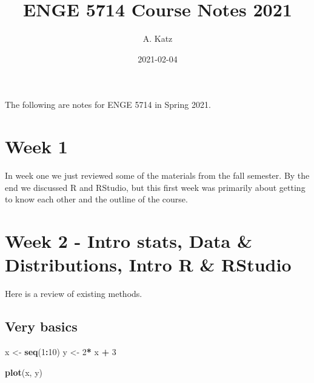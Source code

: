 \documentclass[
]{book}
\title{ENGE 5714 Course Notes 2021}
\author{A. Katz}
\date{2021-02-04}
\newenvironment{Shaded}{\begin{snugshade}}{\end{snugshade}}
\newcommand{\DecValTok}[1]{\textcolor[rgb]{0.00,0.00,0.81}{#1}}
\newcommand{\KeywordTok}[1]{\textcolor[rgb]{0.13,0.29,0.53}{\textbf{#1}}}
\newcommand{\NormalTok}[1]{#1}
\newcommand{\OperatorTok}[1]{\textcolor[rgb]{0.81,0.36,0.00}{\textbf{#1}}}
\newcommand{\StringTok}[1]{\textcolor[rgb]{0.31,0.60,0.02}{#1}}
\begin{document}
\maketitle

{
\setcounter{tocdepth}{1}
\tableofcontents
}
The following are notes for ENGE 5714 in Spring 2021.

\hypertarget{intro}{%
\chapter{Week 1}\label{intro}}

In week one we just reviewed some of the materials from the fall semester. By the end we discussed R and RStudio, but this first week was primarily about getting to know each other and the outline of the course.

\hypertarget{week-2---intro-stats-data-distributions-intro-r-rstudio}{%
\chapter{Week 2 - Intro stats, Data \& Distributions, Intro R \& RStudio}\label{week-2---intro-stats-data-distributions-intro-r-rstudio}}

Here is a review of existing methods.

\hypertarget{very-basics}{%
\section{Very basics}\label{very-basics}}

\begin{Shaded}
\begin{Highlighting}[]
\NormalTok{x \textless{}{-}}\StringTok{ }\KeywordTok{seq}\NormalTok{(}\DecValTok{1}\OperatorTok{:}\DecValTok{10}\NormalTok{)}
\NormalTok{y \textless{}{-}}\StringTok{ }\DecValTok{2}\OperatorTok{*}\StringTok{ }\NormalTok{x }\OperatorTok{+}\StringTok{ }\DecValTok{3}
\end{Highlighting}
\end{Shaded}

\begin{Shaded}
\begin{Highlighting}[]
\KeywordTok{plot}\NormalTok{(x, y)}
\end{Highlighting}
\end{Shaded}
\end{document}
